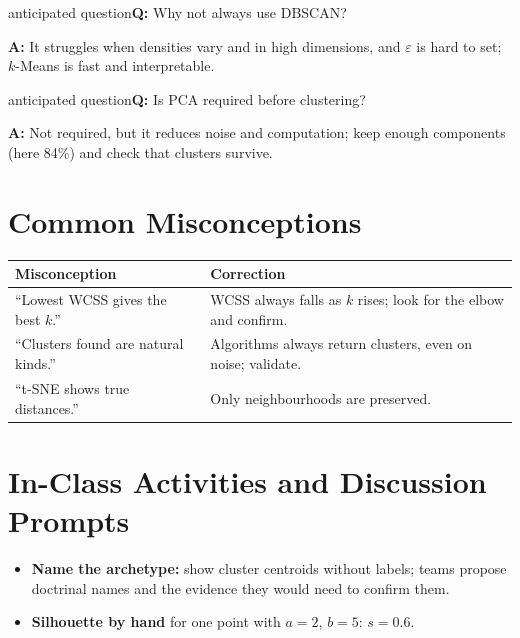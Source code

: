 \documentclass[11pt]{article}
\begin{document}
\begin{question}{anticipated question}\textbf{Q:} Why not always use DBSCAN?\par\smallskip\textbf{A:} It struggles when densities vary and in high dimensions, and $\varepsilon$ is hard to set; $k$-Means is fast and interpretable.\end{question}

\begin{question}{anticipated question}\textbf{Q:} Is PCA required before clustering?\par\smallskip\textbf{A:} Not required, but it reduces noise and computation; keep enough components (here 84\%) and check that clusters survive.\end{question}

\section{Common Misconceptions}\begin{center}\small\renewcommand{\arraystretch}{1.35}\begin{tabularx}{\textwidth}{@{}>{\raggedright\arraybackslash}X >{\raggedright\arraybackslash}X@{}}\toprule\textbf{Misconception} & \textbf{Correction}\\\midrule``Lowest WCSS gives the best $k$.'' & WCSS always falls as $k$ rises; look for the elbow and confirm.\\
``Clusters found are natural kinds.'' & Algorithms always return clusters, even on noise; validate.\\
``t-SNE shows true distances.'' & Only neighbourhoods are preserved.\\\bottomrule\end{tabularx}\end{center}

\section{In-Class Activities and Discussion Prompts}\label{sec:act}\begin{itemize}\item \textbf{Name the archetype:} show cluster centroids without labels; teams propose doctrinal names and the evidence they would need to confirm them.\item \textbf{Silhouette by hand} for one point with $a=2$, $b=5$: $s=0.6$.\end{itemize}
\end{document}
